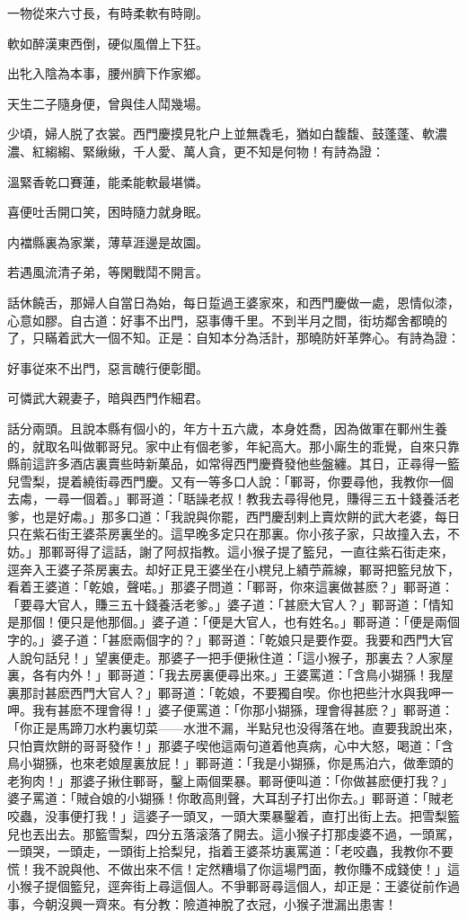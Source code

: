 一物從來六寸長，有時柔軟有時剛。

軟如醉漢東西倒，硬似風僧上下狂。

出牝入陰為本事，腰州臍下作家鄉。

天生二子隨身便，曾與佳人鬦幾場。

少頃，婦人脱了衣裳。西門慶摸見牝户上並無毳毛，猶如白馥馥、鼓蓬蓬、軟濃濃、紅縐縐、緊䋺䋺，千人愛、萬人貪，更不知是何物！有詩為證：

溫緊香乾口賽蓮，能柔能軟最堪憐。

喜便吐舌開口笑，困時隨力就身眠。

内襠縣裏為家業，薄草涯邊是故園。

若遇風流清子弟，等閑戰鬦不開言。

話休饒舌，那婦人自當日為始，每日踅過王婆家來，和西門慶做一處，恩情似漆，心意如膠。自古道：好事不出門，惡事傳千里。不到半月之間，街坊鄰舍都曉的了，只瞞着武大一個不知。正是：自知本分為活計，那曉防奸革弊心。有詩為證：

好事従來不出門，惡言醜行便彰聞。

可憐武大親妻子，暗與西門作細君。

話分兩頭。且說本縣有個小的，年方十五六歲，本身姓喬，因為做軍在鄆州生養的，就取名叫做鄆哥兒。家中止有個老爹，年紀高大。那小廝生的乖覺，自來只靠縣前這許多酒店裏賣些時新菓品，如常得西門慶賚發他些盤纏。其日，正尋得一籃兒雪梨，提着繞街尋西門慶。又有一等多口人說：「鄆哥，你要尋他，我教你一個去䖏，一尋一個着。」鄆哥道：「聒譟老叔！教我去尋得他見，賺得三五十錢養活老爹，也是好䖏。」那多口道：「我說與你罷，西門慶刮剌上賣炊餅的武大老婆，每日只在紫石街王婆茶房裏坐的。這早晚多定只在那裏。你小孩子家，只故撞入去，不妨。」那鄆哥得了這話，謝了阿叔指教。這小猴子提了籃兒，一直往紫石街走來，逕奔入王婆子茶房裏去。却好正見王婆坐在小櫈兒上績苧蔴線，鄆哥把籃兒放下，看着王婆道：「乾娘，聲喏。」那婆子問道：「鄆哥，你來這裏做甚麽？」鄆哥道：「要尋大官人，賺三五十錢養活老爹。」婆子道：「甚麽大官人？」鄆哥道：「情知是那個！便只是他那個。」婆子道：「便是大官人，也有姓名。」鄆哥道：「便是兩個字的。」婆子道：「甚麽兩個字的？」鄆哥道：「乾娘只是要作耍。我要和西門大官人說句話兒！」望裏便走。那婆子一把手便揪住道：「這小猴子，那裏去？人家屋裏，各有内外！」鄆哥道：「我去房裏便尋出來。」王婆罵道：「含鳥小猢猻！我屋裏那討甚麽西門大官人？」鄆哥道：「乾娘，不要獨自喫。你也把些汁水與我呷一呷。我有甚麽不理會得！」婆子便罵道：「你那小猢猻，理會得甚麽？」鄆哥道：「你正是馬蹄刀水杓裏切菜——水泄不漏，半點兒也没得落在地。直要我說出來，只怕賣炊餅的哥哥發作！」那婆子喫他這兩句道着他真病，心中大怒，喝道：「含鳥小猢猻，也來老娘屋裏放屁！」鄆哥道：「我是小猢猻，你是馬泊六，做牽頭的老狗肉！」那婆子揪住鄆哥，鑿上兩個栗暴。鄆哥便叫道：「你做甚麽便打我？」婆子罵道：「賊㒲娘的小猢猻！你敢高則聲，大耳刮子打出你去。」鄆哥道：「賊老咬蟲，没事便打我！」這婆子一頭叉，一頭大栗暴鑿着，直打出街上去。把雪梨籃兒也丟出去。那籃雪梨，四分五落滚落了開去。這小猴子打那虔婆不過，一頭駡，一頭哭，一頭走，一頭街上拾梨兒，指着王婆茶坊裏罵道：「老咬蟲，我教你不要慌！我不說與他、不做出來不信！定然糟塌了你這場門面，教你賺不成錢使！」這小猴子提個籃兒，逕奔街上尋這個人。不爭鄆哥尋這個人，却正是：王婆従前作過事，今朝沒興一齊來。有分教：險道神脫了衣冠，小猴子泄漏出患害！

